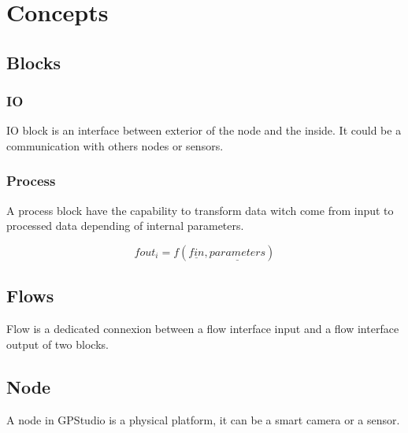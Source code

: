 \chapter{Concepts}

\section{Blocks}

\subsection{IO}
IO block is an interface between exterior of the node and the inside. It could be a communication with others nodes or sensors. 

\subsection{Process}
A process block have the capability to transform data witch come from input to processed data depending of internal parameters.

\begin{equation}
fout_{i}=f(\underline{fin}, \underline{parameters})
\end{equation}

\section{Flows}
Flow is a dedicated connexion between a flow interface input and a flow interface output of two blocks.

\section{Node}
A node in GPStudio is a physical platform, it can be a smart camera or a sensor.
